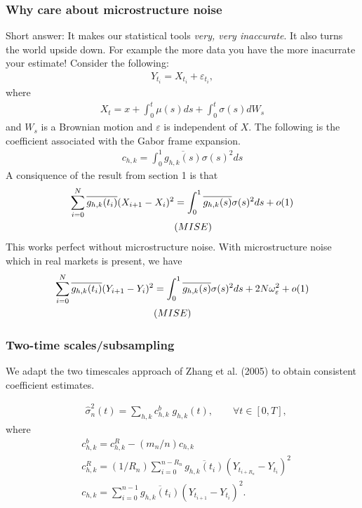\documentclass[fleqn]{beamer}
\begin{document}
\begin{frame}[allowframebreaks]
\frametitle{Why care about microstructure noise}
Short answer: It makes our statistical tools \emph{very, very inaccurate}. It also turns the world upside down. For example the more data you have the more inacurrate your estimate!
Consider the following:
\begin{align}
  Y_{t_i} = X_{t_i} + \varepsilon_{t_i},
\end{align}
where
\begin{align}
  X_t = x + \int_0^t \mu(s) ds + \int_0^t \sigma(s) d W_s \label{x}
\end{align}
and $W_s$ is a Brownian motion and $\varepsilon$ is independent of $X$.
The following is the coefficient associated with the Gabor frame expansion.
\begin{align}
  c_{h,k} = \int_0^1\overline{g_{h,k}(s)}\sigma(s)^2ds
\end{align}
A consiquence of the result from section 1 is that
\begin{align}
  \sum_{i=0}^{N} \overline{g_{h,k}(t_i)}(X_{{i+1}} - X_i)^2 & =    \int_0^1\overline{g_{h,k}(s)}\sigma(s)^2ds + o(1) \notag \\ 
  & (MISE)\notag
\end{align}
This works perfect without microstructure noise. With microstructure noise which in real markets is present, we have 
\begin{align}
  \sum_{i=0}^{N} \overline{g_{h,k}(t_i)}(Y_{{i+1}} - Y_i)^2& =    \int_0^1\overline{g_{h,k}(s)}\sigma(s)^2ds + 2N\omega^2_\varepsilon + o(1)\notag \\
  &(MISE) \notag
\end{align}
\end{frame}
\begin{frame}
  \frametitle{Two-time scales/subsampling}
  We adapt the two timescales approach of Zhang et al. (2005) to obtain consistent coefficient estimates.
 
\begin{align}
  &\hat{\sigma}^2_n(t) = \sum_{h,k} c_{h,k}^b\;g_{h,k}(t),\qquad \forall t \in [0,T], \label{eq:noiseest}
\end{align}
where
\begin{align}
  &c_{h,k}^b = c_{h,k}^R - (m_n/n)c_{h,k} \\
  &c_{h,k}^R = (1/R_n)\sum_{i =0}^{n -R_n} \overline{g_{h,k}(t_i)} (Y_{t_{i+R_n}} - Y_{t_i})^2 \label{eq:subset} \\
  &c_{h,k} = \sum_{i =0}^{n-1} \overline{g_{h,k}(t_i)} (Y_{t_{i+1}} - Y_{t_i})^2.
  \label{}
\end{align}
\end{frame}
\end{document}
